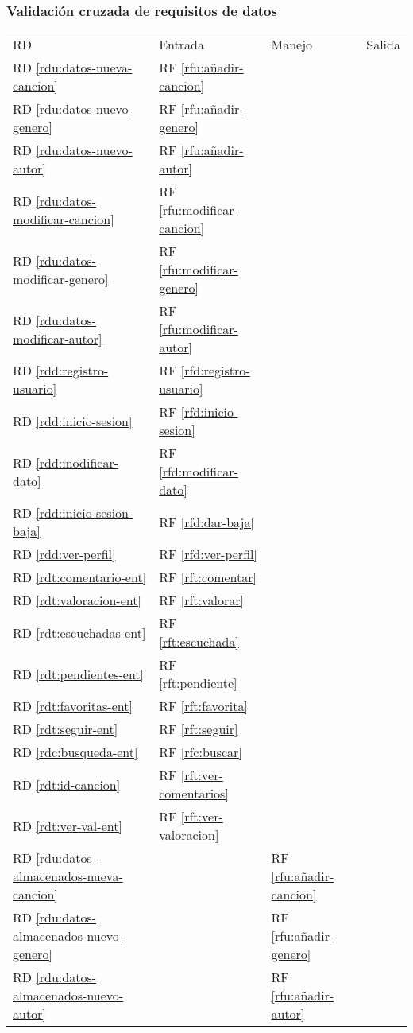 \subsubsection{Validación cruzada de requisitos de datos}
\keepXColumns
\begin{tabularx}{\linewidth}{l|XXX}
  RD & Entrada & Manejo & Salida \\
  RD \ref{rdu:datos-nueva-cancion} & RF \ref{rfu:añadir-cancion} & & \\
  RD \ref{rdu:datos-nuevo-genero} & RF \ref{rfu:añadir-genero} & & \\
  RD \ref{rdu:datos-nuevo-autor} & RF \ref{rfu:añadir-autor} \\
  RD \ref{rdu:datos-modificar-cancion} & RF \ref{rfu:modificar-cancion} & & \\
  RD \ref{rdu:datos-modificar-genero} & RF \ref{rfu:modificar-genero} & & \\
  RD \ref{rdu:datos-modificar-autor} & RF \ref{rfu:modificar-autor} \\
  RD \ref{rdd:registro-usuario} & RF \ref{rfd:registro-usuario} & & \\
  RD \ref{rdd:inicio-sesion} & RF \ref{rfd:inicio-sesion} & & \\
  RD \ref{rdd:modificar-dato} & RF \ref{rfd:modificar-dato} & & \\
  RD \ref{rdd:inicio-sesion-baja} & RF \ref{rfd:dar-baja} & & \\
  RD \ref{rdd:ver-perfil} & RF \ref{rfd:ver-perfil} & & \\
  RD \ref{rdt:comentario-ent} & RF \ref{rft:comentar} & & \\
  RD \ref{rdt:valoracion-ent} & RF \ref{rft:valorar} & & \\
  RD \ref{rdt:escuchadas-ent} & RF \ref{rft:escuchada} & & \\
  RD \ref{rdt:pendientes-ent} & RF \ref{rft:pendiente} & & \\
  RD \ref{rdt:favoritas-ent} & RF \ref{rft:favorita} & & \\
  RD \ref{rdt:seguir-ent} & RF \ref{rft:seguir} & & \\
  RD \ref{rdc:busqueda-ent} & RF \ref{rfc:buscar} & & \\
  RD \ref{rdt:id-cancion}  & RF \ref{rft:ver-comentarios} & & \\
  RD \ref{rdt:ver-val-ent} & RF \ref{rft:ver-valoracion} & & \\
  RD \ref{rdu:datos-almacenados-nueva-cancion} & & RF \ref{rfu:añadir-cancion} & \\
  RD \ref{rdu:datos-almacenados-nuevo-genero} & & RF \ref{rfu:añadir-genero} & \\
  RD \ref{rdu:datos-almacenados-nuevo-autor} & & RF \ref{rfu:añadir-autor} & \\


\end{tabularx}

